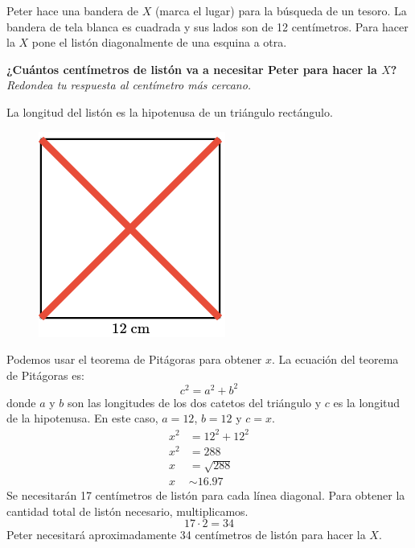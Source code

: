 Peter hace una bandera de $X$ (marca el lugar) para la búsqueda de un tesoro.
La bandera de tela blanca es cuadrada y sus lados son de 12 centímetros.
Para hacer la $X$ pone el listón diagonalmente de una esquina a otra.

\textbf{¿Cuántos centímetros de listón va a necesitar Peter para hacer la $X$?}\\
\textit{Redondea tu respuesta al centímetro más cercano.}

\begin{solutionbox}{15cm}
    La longitud del listón es la hipotenusa de un triángulo rectángulo.
    \begin{figure}[H]
        \centering
        \includegraphics[width=0.2\linewidth]{../images/proverb_pitagoras_10.png}
        \caption{}
        \label{fig:proverb_pitagoras_10}
    \end{figure}
    Podemos usar el teorema de Pitágoras para obtener $x$.
    La ecuación del teorema de Pitágoras es:
    \[c^2=a^2+b^2\]
    donde $a$ y $b$ son las longitudes de los dos catetos del triángulo y $c$ es la longitud de la hipotenusa.
    En este caso, $a=12$, $b=12$ y $c=x$.
    \begin{align*}
        x^2 & =12^2+12^2  \\
        x^2 & =288        \\
        x   & =\sqrt{288} \\
        x   & \sim 16.97
    \end{align*}
    Se necesitarán 17 centímetros de listón para cada línea diagonal. Para obtener la cantidad total de listón necesario, multiplicamos.
    \[17\cdot 2=34\]
    Peter necesitará aproximadamente 34 centímetros de listón para hacer la $X$.
\end{solutionbox}